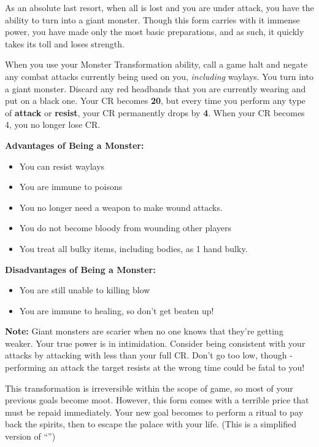 \documentclass[green]{NeptuneBall}
\begin{document}
\name{\gMonsterTransformation{}}

As an absolute last resort, when all is lost and you are under attack, you have the ability to turn into a giant monster. Though this form carries with it immense power, you have made only the most basic preparations, and as such, it quickly takes its toll and loses strength.

When you use your Monster Transformation ability, call a game halt and negate any combat attacks currently being used on you, \emph{including} waylays. You turn into a giant monster. Discard any red headbands that you are currently wearing and put on a black one. Your CR becomes {\bf 20}, but every time you perform any type of {\bf attack} or {\bf resist}, your CR permanently drops by {\bf 4}. When your CR becomes 4, you no longer lose CR.

{\bf Advantages of Being a Monster:}
\begin{itemize}
\item You can resist waylays
\item You are immune to poisons
\item You no longer need a weapon to make wound attacks.
\item You do not become bloody from wounding other players
\item You treat all bulky items, including bodies, as 1 hand bulky.
\end{itemize}

{\bf Disadvantages of Being a Monster:}
\begin{itemize}
\item You are still unable to killing blow
\item You are immune to healing, so don't get beaten up!
\end{itemize}

{\bf Note:} Giant monsters are scarier when no one knows that they're getting weaker. Your true power is in intimidation. Consider being consistent with your attacks by attacking with less than your full CR. Don't go too low, though - performing an attack the target resists at the wrong time could be fatal to you! 

This transformation is irreversible within the scope of game, so most of your previous goals become moot. However, this form comes with a terrible price that must be repaid immediately. Your new goal becomes to perform a ritual to pay back the spirits, then to escape the palace with your life. (This is a simplified version of ``\gRitual{}'')
\end{document}
